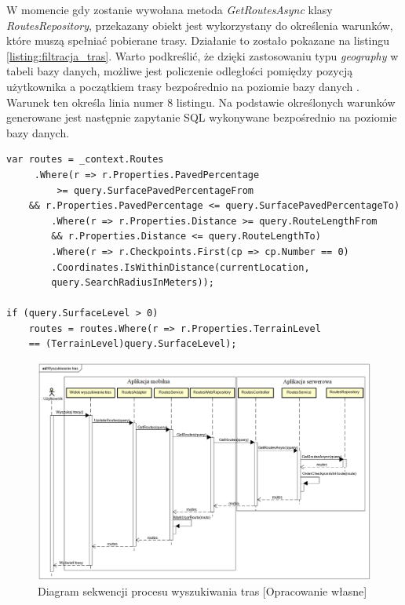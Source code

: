 W momencie gdy zostanie wywołana metoda \textit{GetRoutesAsync} klasy \textit{RoutesRepository}, przekazany obiekt jest wykorzystany do określenia warunków, które muszą spełniać pobierane trasy. Działanie to zostało pokazane na listingu \ref{listing:filtracja_tras}. Warto podkreślić, że dzięki zastosowaniu typu \textit{geography} w tabeli bazy danych, możliwe jest policzenie odległości pomiędzy pozycją użytkownika a początkiem trasy bezpośrednio na poziomie bazy danych \cite{geography-type, geography-type2}. Warunek ten określa linia numer 8 listingu. Na podstawie określonych warunków generowane jest następnie zapytanie SQL wykonywane bezpośrednio na poziomie bazy danych.
\begin{lstlisting}[caption={Określenie warunków dla pobieranych tras},label=listing:filtracja_tras]
var routes = _context.Routes
	 .Where(r => r.Properties.PavedPercentage 
         >= query.SurfacePavedPercentageFrom
	&& r.Properties.PavedPercentage <= query.SurfacePavedPercentageTo)
        .Where(r => r.Properties.Distance >= query.RouteLengthFrom
        && r.Properties.Distance <= query.RouteLengthTo)
        .Where(r => r.Checkpoints.First(cp => cp.Number == 0)
        .Coordinates.IsWithinDistance(currentLocation,
        query.SearchRadiusInMeters));

if (query.SurfaceLevel > 0)
	routes = routes.Where(r => r.Properties.TerrainLevel 
	== (TerrainLevel)query.SurfaceLevel);
\end{lstlisting}
\begin{figure}[h]\label{fig:api_model}
\begin{center}
\includegraphics[width=\textwidth]{img/diagram_sekwencji_wyszukiwanie.png}
\caption{Diagram sekwencji procesu wyszukiwania tras [Opracowanie własne]}\label{image:sekwencja_wyszukiwanie}
\end{center}
\end{figure}
